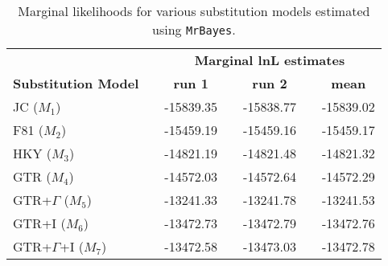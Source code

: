%
\newpage
\begin{Form}
\begin{table}[h]
\centering
\caption{\small Marginal likelihoods for various substitution models estimated using \texttt{MrBayes}.}
\begin{tabular}{l c c c c c c}
\hline
\multicolumn{1}{l}{\textbf{ }} &\multicolumn{1}{r}{\textbf{ }} & \multicolumn{5}{c}{\textbf{Marginal lnL estimates}} \\ 
\cline{3-7}
\multicolumn{1}{l}{\textbf{Substitution Model}} & \multicolumn{1}{r}{\hspace{3mm}} & \multicolumn{1}{c}{\textbf{run 1}} & \multicolumn{1}{r}{\hspace{3mm}} & \multicolumn{1}{c}{\textbf{run 2}} & \multicolumn{1}{r}{\hspace{3mm}} & \multicolumn{1}{c}{\textbf{mean}} \\ 
\hline
JC ($M_1$) & \hspace{15mm} 					&-15839.35  		& \hspace{3mm} & -15838.77  		& \hspace{3mm} & -15839.02\\
\hline
F81 ($M_2$) & \hspace{15mm} 				& -15459.19   		& \hspace{3mm} & -15459.16 			& \hspace{3mm} &  -15459.17\\
\hline
HKY ($M_3$) & \hspace{15mm} 				&  -14821.19 		& \hspace{3mm} &  -14821.48  		& \hspace{3mm} & -14821.32 \\
\hline
GTR ($M_4$) & \hspace{15mm} 				& -14572.03  		& \hspace{3mm} &  -14572.64   		& \hspace{3mm} &  -14572.29\\
\hline
GTR+$\Gamma$ ($M_5$) & \hspace{15mm} 		& -13241.33  		& \hspace{3mm} & -13241.78   		& \hspace{3mm} & -13241.53 \\
\hline
GTR+I ($M_6$)  & \hspace{15mm} 				&-13472.73  		& \hspace{3mm} & -13472.79   		& \hspace{3mm} &  -13472.76\\
\hline
GTR+$\Gamma$+I ($M_7$) & \hspace{15mm} 	&-13472.58 		& \hspace{3mm} & -13473.03  		& \hspace{3mm} & -13472.78 \\
\hline
\hline
\end{tabular}
\label{tab:ml_cytb}
\end{table}
\end{Form}




